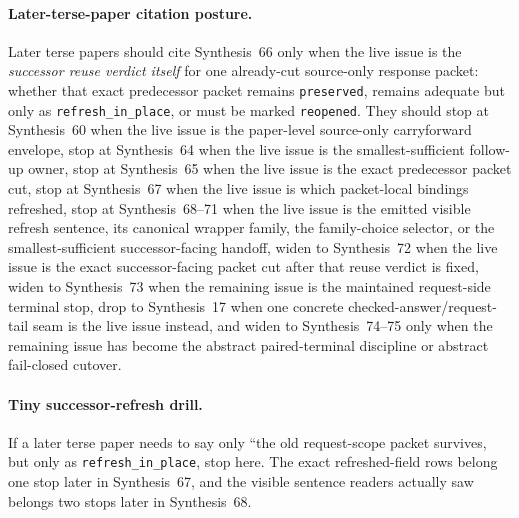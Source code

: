 \documentclass[11pt]{article}
\begin{document}
\paragraph{Later-terse-paper citation posture.}
Later terse papers should cite Synthesis~66 only when the live issue is the \emph{successor reuse verdict itself} for one already-cut source-only response packet: whether that exact predecessor packet remains \texttt{preserved}, remains adequate but only as \texttt{refresh\_in\_place}, or must be marked \texttt{reopened}. They should stop at Synthesis~60 when the live issue is the paper-level source-only carryforward envelope, stop at Synthesis~64 when the live issue is the smallest-sufficient follow-up owner, stop at Synthesis~65 when the live issue is the exact predecessor packet cut, stop at Synthesis~67 when the live issue is which packet-local bindings refreshed, stop at Synthesis~68--71 when the live issue is the emitted visible refresh sentence, its canonical wrapper family, the family-choice selector, or the smallest-sufficient successor-facing handoff, widen to Synthesis~72 when the live issue is the exact successor-facing packet cut after that reuse verdict is fixed, widen to Synthesis~73 when the remaining issue is the maintained request-side terminal stop, drop to Synthesis~17 when one concrete checked-answer/request-tail seam is the live issue instead, and widen to Synthesis~74--75 only when the remaining issue has become the abstract paired-terminal discipline or abstract fail-closed cutover.\cite{series:publicrequestresponsepacketrefreshnotices,series:publicrequestresponsepacketrefreshnoticenormalforms,series:publicrequestresponsepacketrefreshnoticeselections,series:publicrequestresponsepacketrefreshresponsemenus,series:publicrequestresponsepacketrefreshresponsepackets}

\paragraph{Tiny successor-refresh drill.}
If a later terse paper needs to say only ``the old request-scope packet survives, but only as \texttt{refresh\_in\_place}, stop here. The exact refreshed-field rows belong one stop later in Synthesis~67, and the visible sentence readers actually saw belongs two stops later in Synthesis~68.
\end{document}
